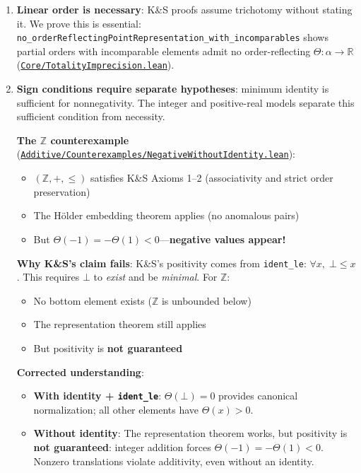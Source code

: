 \documentclass[11pt]{article}
\theoremstyle{definition}
\theoremstyle{remark}
\begin{document}
\begin{enumerate}
\item \textbf{Linear order is necessary}: K\&S proofs assume trichotomy without stating it.
We prove this is essential: \texttt{no\_orderReflectingPointRepresentation\_with\_incomparables} shows
partial orders with incomparable elements admit no order-reflecting $\Theta : \alpha \to \mathbb{R}$
(\href{https://github.com/zariuq/ks-foundations-of-inference/blob/main/KnuthSkilling/Core/TotalityImprecision.lean}{\texttt{Core/TotalityImprecision.lean}}).

\item \textbf{Sign conditions require separate hypotheses}: minimum identity is sufficient for nonnegativity.
The integer and positive-real models separate this sufficient condition from necessity.

\textbf{The $\mathbb{Z}$ counterexample} (\href{https://github.com/zariuq/ks-foundations-of-inference/blob/main/KnuthSkilling/Additive/Counterexamples/NegativeWithoutIdentity.lean}{\texttt{Additive/Counterexamples/NegativeWithoutIdentity.lean}}):
\begin{itemize}
\item $(\mathbb{Z}, +, \leq)$ satisfies K\&S Axioms 1--2 (associativity and strict order preservation)
\item The Hölder embedding theorem applies (no anomalous pairs)
\item But $\Theta(-1)=-\Theta(1)<0$---\textbf{negative values appear!}
\end{itemize}

\textbf{Why K\&S's claim fails}: K\&S's positivity comes from \texttt{ident\_le}: $\forall x,\; \bot \leq x$.
This requires $\bot$ to \emph{exist} and be \emph{minimal}. For $\mathbb{Z}$:
\begin{itemize}
\item No bottom element exists ($\mathbb{Z}$ is unbounded below)
\item The representation theorem still applies
\item But positivity is \textbf{not guaranteed}
\end{itemize}

\textbf{Corrected understanding}:
\begin{itemize}
\item \textbf{With identity + \texttt{ident\_le}}: $\Theta(\bot) = 0$ provides canonical normalization;
      all other elements have $\Theta(x) > 0$.
\item \textbf{Without identity}: The representation theorem works, but positivity is
      \textbf{not guaranteed}: integer addition forces $\Theta(-1)=-\Theta(1)<0$.
      Nonzero translations violate additivity, even without an identity.
\end{itemize}


\end{enumerate}
\end{document}
